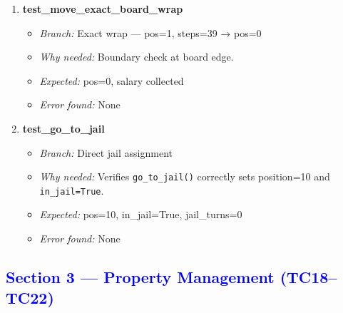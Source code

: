 \documentclass{article}
\begin{document}
\begin{enumerate}[resume, label=\textbf{TC\arabic*.}]
  \item \textbf{test\_move\_exact\_board\_wrap}
  \begin{itemize}[noitemsep]
    \item \textit{Branch:} Exact wrap — pos=1, steps=39 → pos=0
    \item \textit{Why needed:} Boundary check at board edge.
    \item \textit{Expected:} pos=0, salary collected
    \item \textit{Error found:} None
  \end{itemize}

  \item \textbf{test\_go\_to\_jail}
  \begin{itemize}[noitemsep]
    \item \textit{Branch:} Direct jail assignment
    \item \textit{Why needed:} Verifies \texttt{go\_to\_jail()} correctly sets position=10 and \texttt{in\_jail=True}.
    \item \textit{Expected:} pos=10, in\_jail=True, jail\_turns=0
    \item \textit{Error found:} None
  \end{itemize}

\end{enumerate}

\subsection*{\textcolor{blue}{Section 3 — Property Management (TC18–TC22)}}
\end{document}
